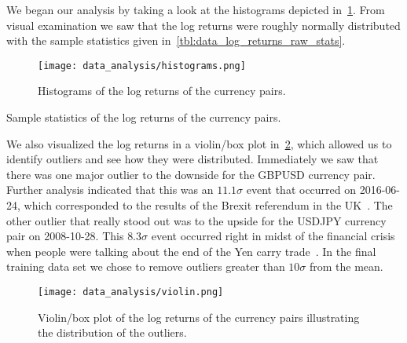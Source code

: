We began our analysis by taking a look at the histograms depicted in~\cref{fig:histograms_raw}.
From visual examination we saw that the log returns were roughly normally distributed with the sample statistics given in~\cref{tbl:data_log_returns_raw_stats}.
\begin{figure}[!htb]
    \begin{center}
        \texttt{[image: data\_analysis/histograms.png]}
    \end{center}
    \caption{Histograms of the log returns of the currency pairs.}
    \label{fig:histograms_raw}
\end{figure}

\begin{table}[!htb]
    \centering
    \begin{adjustbox}{max width=\textwidth}
        
    \end{adjustbox}
    \caption{Sample statistics of the log returns of the currency pairs.}
    \label{tbl:data_log_returns_raw_stats}
\end{table}

We also visualized the log returns in a violin/box plot in~\cref{fig:violin_raw}, which allowed us to identify outliers and see how they were distributed.
Immediately we saw that there was one major outlier to the downside for the GBPUSD currency pair.
Further analysis indicated that this was an \( 11.1\sigma \) event that occurred on 2016-06-24, which corresponded to the results of the Brexit referendum in the UK~\cite{brexit_gov_uk}.
The other outlier that really stood out was to the upside for the USDJPY currency pair on 2008-10-28.
This \( 8.3\sigma \) event occurred right in midst of the financial crisis when people were talking about the end of the Yen carry trade~\cite{jpy_carry_trade_nyt}.
In the final training data set we chose to remove outliers greater than \( 10\sigma \) from the mean.
\begin{figure}[!htb]
    \begin{center}
        \texttt{[image: data\_analysis/violin.png]}
    \end{center}
    \caption{Violin/box plot of the log returns of the currency pairs illustrating the distribution of the outliers.}
    \label{fig:violin_raw}
\end{figure}

